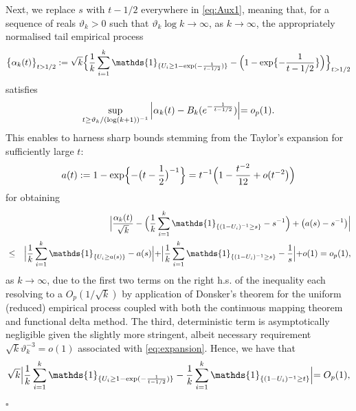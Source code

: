 \documentclass[11pt, a4paper, oneside]{article}
\numberwithin{equation}{section}
\theoremstyle{plain}
\theoremstyle{definition}
\newenvironment{pfofLem}{\noindent{\bf Proof of Lemma}}{\hfill $\square$ \\}
\newcommand{\suprem}[1]{\ensuremath{\displaystyle {\sup_{#1}}}}
\newcommand{\one}{\mathds{1}}
\begin{document}
\begin{pfofLem}{~\ref{Lem:BasicEmpProcess}:}
\noindent Next, we replace $s$ with $t-1/2$ everywhere in \eqref{eq:Aux1}, meaning that, for a sequence of reals $\vartheta_{k}> 0$ such that $\vartheta_k \log k \rightarrow \infty$, as $k \rightarrow \infty$, the appropriately normalised tail empirical process
\begin{equation}\label{eq:Alphak}
	\bigl\{\alpha_k(t) \bigr\}_{t > 1/2} := \sqrt{k}\Bigl\{\frac{1}{k}\displaystyle\sum_{i=1} ^{k}\one_{\{U_{i}\geq 1-\exp(-\frac{1}{t-1/2})\}}-\Bigl(1-\exp\bigl\{-\frac{1}{t-1/2}\bigr\}\Bigr) \Bigl\}_{t > 1/2}
\end{equation}
satisfies
\begin{equation*}
   \suprem{t \geq \vartheta_k/(\log (k+1))^{-1}} \, \Bigl|\alpha_k(t)-B_{k}(e^{-\frac{1}{t-1/2}})\Bigl|=o_{p}(1).
\end{equation*}
This enables to harness sharp bounds stemming from the Taylor's expansion for sufficiently large $t$:
\begin{equation}\label{eq:expansion}
    a(t) := 1- \exp\Bigl\{- \big(t -\frac{1}{2} \bigr)^{-1} \Bigr\}= t^{-1}\Bigl(1- \frac{t^{-2}}{12} + o(t^{-2} \bigl)\Bigr)
\end{equation}
for obtaining
\begin{eqnarray*}
      & & \Bigl|  \frac{\alpha_k(t)}{\sqrt{k}} - \Bigl(\frac{1}{k}\displaystyle\sum_{i=1} ^{k}\one_{\{(1-U_i)^{-1}\geq s\}}-s^{-1} \Bigr)+\bigl(a(s)-s^{-1}\bigl)\Bigl|\\
   &\leq &  \Bigl|\frac{1}{k}\displaystyle\sum_{i=1} ^{k}\one_{\{U_{i}\geq a(s)\}}-a(s)\Bigl|+\Bigl|\frac{1}{k}\displaystyle\sum_{i=1} ^{k}\one_{\{(1-U_i)^{-1}\geq s\}}-\frac{1}{s}\Bigl|+o(1)=o_{p}(1),
\end{eqnarray*}
 as $k\rightarrow \infty$, due to the first two terms on the right h.s. of the inequality each resolving to a $O_{p}(1/\sqrt{k})$ by application of Donsker's theorem for the uniform (reduced) empirical process coupled with both the continuous mapping theorem and functional delta method. The third, deterministic term is asymptotically negligible given the slightly more stringent, albeit necessary requirement $\sqrt{k} \vartheta_k^{-3} =o(1)$ associated with \eqref{eq:expansion}. Hence, we have that
\begin{equation*}
   \sqrt{k} \Bigl|\frac{1}{k}\displaystyle\sum_{i=1} ^{k}\one_{\{U_{i}\geq 1-\exp(-\frac{1}{t-1/2})\}} -\frac{1}{k}\displaystyle\sum_{i=1} ^{k}\one_{\{(1-U_i)^{-1} \geq t\}}\Bigl| = O_p(1),

\end{equation*}
\end{pfofLem}
\end{document}
